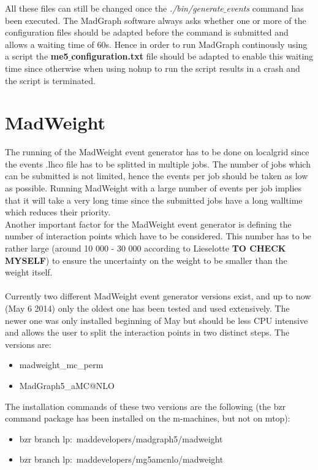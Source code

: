 \documentclass[a4paper,12pt]{report}
\begin{document}
All these files can still be changed once the \textit{./bin/generate$\_$events} command has been executed. The MadGraph software always asks whether one or more of the configuration files should be adapted before the command is submitted and allows a waiting time of 60s. Hence in order to run MadGraph continously using a script the \textbf{me5$\_$configuration.txt} file should be adapted to enable this waiting time since otherwise when using nohup to run the script results in a crash and the script is terminated.

\section{MadWeight}

The running of the MadWeight event generator has to be done on localgrid since the events .lhco file has to be splitted in multiple jobs. The number of jobs which can be submitted is not limited, hence the events per job should be taken as low as possible. Running MadWeight with a large number of events per job implies that it will take a very long time since the submitted jobs have a long walltime which reduces their priority. \\
Another important factor for the MadWeight event generator is defining the number of interaction points which have to be considered. This number has to be rather large (around 10 000 - 30 000 according to Lieselotte \textbf{TO CHECK MYSELF}) to ensure the uncertainty on the weight to be smaller than the weight itself.\\
\\
Currently two different MadWeight event generator versions exist, and up to now (May 6 2014) only the oldest one has been tested and used extensively. The newer one was only installed beginning of May but should be less CPU intensive and allows the user to split the interaction points in two distinct steps. The versions are:
\begin{itemize}
  \item madweight\_mc\_perm
  \item MadGraph5\_aMC@NLO
\end{itemize}

The installation commands of these two versions are the following (the bzr command package has been installed on the m-machines, but not on mtop):
\begin{itemize}
  \item bzr branch lp:~maddevelopers/madgraph5/madweight 
  \item bzr branch lp:~maddevelopers/mg5amcnlo/madweight
\end{itemize}
\end{document}

